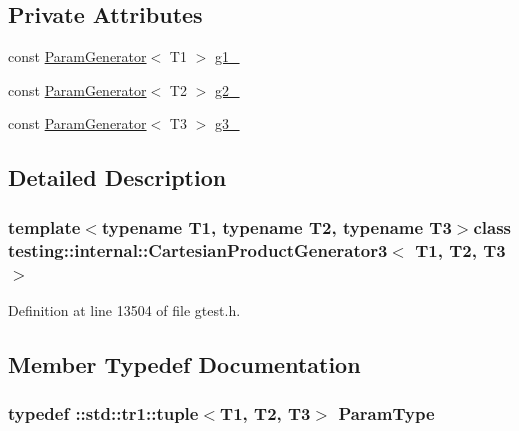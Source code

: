\subsection*{\-Private \-Attributes}
\begin{DoxyCompactItemize}
\item 
const \hyperlink{classtesting_1_1internal_1_1ParamGenerator}{\-Param\-Generator}$<$ \-T1 $>$ \hyperlink{classtesting_1_1internal_1_1CartesianProductGenerator3_a315f81360fc67b016cbf514cb78c1975}{g1\-\_\-}
\item 
const \hyperlink{classtesting_1_1internal_1_1ParamGenerator}{\-Param\-Generator}$<$ \-T2 $>$ \hyperlink{classtesting_1_1internal_1_1CartesianProductGenerator3_a4bd40d1fbb8c6d2895b5201e62afbe38}{g2\-\_\-}
\item 
const \hyperlink{classtesting_1_1internal_1_1ParamGenerator}{\-Param\-Generator}$<$ \-T3 $>$ \hyperlink{classtesting_1_1internal_1_1CartesianProductGenerator3_acda98d4bf8f619856fb2e0ec015b9bc8}{g3\-\_\-}
\end{DoxyCompactItemize}


\subsection{\-Detailed \-Description}
\subsubsection*{template$<$typename T1, typename T2, typename T3$>$class testing\-::internal\-::\-Cartesian\-Product\-Generator3$<$ T1, T2, T3 $>$}



\-Definition at line 13504 of file gtest.\-h.



\subsection{\-Member \-Typedef \-Documentation}
\hypertarget{classtesting_1_1internal_1_1CartesianProductGenerator3_a61f35be35e7acfed27d8b46ee9713bb3}{
\subsubsection[{\-Param\-Type}]{\setlength{\rightskip}{0pt plus 5cm}typedef \-::{\bf std\-::tr1\-::tuple}$<$\-T1, \-T2, \-T3$>$ {\bf \-Param\-Type}}}\label{d1/d15/classtesting_1_1internal_1_1CartesianProductGenerator3_a61f35be35e7acfed27d8b46ee9713bb3}


